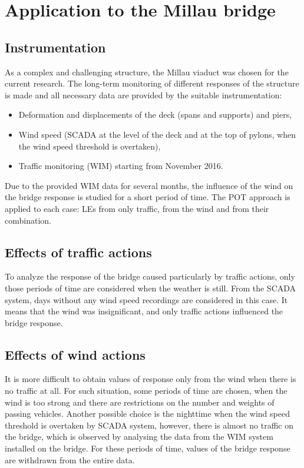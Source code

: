 \documentclass[11pt,a4paper]{article}
\begin{document}
\section{Application to the Millau bridge}
\subsection{Instrumentation}
\medskip
As a complex and challenging structure, the Millau viaduct was chosen for the current research. The long-term monitoring of different responses of the structure is made and all necessary data are provided by the suitable instrumentation:
\begin{itemize}
	\item Deformation and displacements of the deck (spans and supports) and piers,
	\item Wind speed (SCADA at the level of the deck and at the top of pylons, when the wind speed threshold is overtaken),
	\item Traffic monitoring (WIM) starting from November 2016. 
\end{itemize}
Due to the provided WIM data for several months, the influence of the wind on the bridge response is studied for a short period of time. The POT approach is applied to each case: LEs from only traffic, from the wind and from their combination. 
\subsection{Effects of traffic actions}
To analyze the response of the bridge caused particularly by traffic actions, only those periods of time are considered when the weather is still. From the SCADA system, days without any wind speed recordings are considered in this case. It means that the wind was insignificant, and only traffic actions influenced the bridge response.
\subsection{Effects of wind actions}
It is more difficult to obtain values of response only from the wind when there is no traffic at all. For such situation, some periods of time are chosen, when the wind is too strong and there are restrictions on the number and weights of passing vehicles. Another possible choice is the nighttime when the wind speed threshold is overtaken by SCADA system, however, there is almost no traffic on the bridge, which is observed by analysing the data from the WIM system installed on the bridge. For these periods of time, values of the bridge response are withdrawn from the entire data. 
\end{document}
